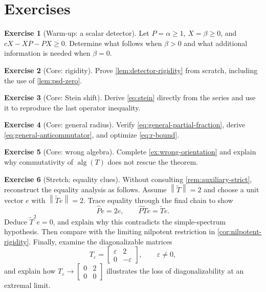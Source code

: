 \documentclass[11pt,oneside,openany]{book}
\theoremstyle{definition}
\newtheorem{exercise}{Exercise}[chapter]
\theoremstyle{remark}
\newcommand{\alg}{\operatorname{alg}}
\newcommand{\norm}[1]{\left\lVert #1\right\rVert}
\begin{document}
\section{Exercises}

\begin{exercise}[Warm-up: a scalar detector]
Let \(P=\alpha\geq1\), \(X=\beta\geq0\), and
\(cX-XP-PX\geq0\).  Determine what follows when \(\beta>0\) and what
additional information is needed when \(\beta=0\).
\end{exercise}

\begin{exercise}[Core: rigidity]
Prove \cref{lem:detector-rigidity} from scratch, including the use of
\cref{lem:psd-zero}.
\end{exercise}

\begin{exercise}[Core: Stein shift]
\label{ex:stein-shift}
Derive \eqref{eq:stein} directly from the series and use it to reproduce
the last operator inequality.
\end{exercise}

\begin{exercise}[Core: general radius]
\label{ex:general-radius}
Verify \eqref{eq:general-partial-fraction}, derive
\eqref{eq:general-anticommutator}, and optimize
\eqref{eq:r-bound}.
\end{exercise}

\begin{exercise}[Core: wrong algebra]
Complete \cref{ex:wrong-orientation} and explain why commutativity of
\(\alg(T)\) does not rescue the theorem.
\end{exercise}

\begin{exercise}[Stretch: equality clues]
Without consulting \cref{rem:auxiliary-strict}, reconstruct the
equality analysis as follows.  Assume \(\norm{\widetilde T}=2\) and
choose a unit vector \(e\) with \(\norm{\widetilde Te}=2\).  Trace
equality through the final chain to show
\[
  \widehat Pe=2e,
  \qquad
  \widehat P\widetilde Te=\widetilde Te.
\]
Deduce \(\widetilde T^2e=0\), and explain why this contradicts the
simple-spectrum hypothesis.  Then compare with the limiting nilpotent
restriction in \cref{cor:nilpotent-rigidity}.  Finally, examine the
diagonalizable matrices
\[
  T_\varepsilon=
  \begin{bmatrix}
    \varepsilon&2\\
    0&-\varepsilon
  \end{bmatrix},
  \qquad \varepsilon\neq0,
\]
and explain how \(T_\varepsilon\to
\begin{bmatrix}0&2\\0&0\end{bmatrix}\) illustrates the loss of
diagonalizability at an extremal limit.
\end{exercise}
\end{document}
